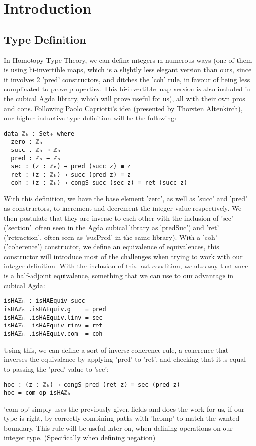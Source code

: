 \chapter{Introduction}
\label{ch:intro}

\section{Type Definition}

In Homotopy Type Theory, we can define integers in numerous ways (one of them is using bi-invertible maps, which is a slightly less elegant version than ours\cite{10.1145/3373718.3394760}, since it involves 2 'pred' constructors, and ditches the 'coh' rule, in favour of being less complicated to prove properties. This bi-invertible map version is also included in the cubical Agda library\cite{biinv-agda}, which will prove useful for us), all with their own pros and cons. Following Paolo Capriotti's idea (presented by Thorsten Altenkirch\cite{bonn_2018}), our higher inductive type definition will be the following:
\begin{verbatim}
data ℤₕ : Set₀ where
  zero : ℤₕ
  succ : ℤₕ → ℤₕ
  pred : ℤₕ → ℤₕ
  sec : (z : ℤₕ) → pred (succ z) ≡ z
  ret : (z : ℤₕ) → succ (pred z) ≡ z
  coh : (z : ℤₕ) → congS succ (sec z) ≡ ret (succ z)
\end{verbatim}
With this definition, we have the base element 'zero', as well as 'succ' and 'pred' as constructors, to increment and decrement the integer value respectively. We then postulate that they are inverse to each other with the inclusion of 'sec' ('section', often seen in the Agda cubical library as 'predSuc') and 'ret' ('retraction', often seen as 'sucPred' in the same library). With a 'coh' ('coherence') constructor, we define an equivalence of equivalences, this constructor will introduce most of the challenges when trying to work with our integer definition. With the inclusion of this last condition, we also say that succ is a half-adjoint equivalence, something that we can use to our advantage in cubical Agda:
\begin{verbatim}
isHAℤₕ : isHAEquiv succ
isHAℤₕ .isHAEquiv.g    = pred
isHAℤₕ .isHAEquiv.linv = sec
isHAℤₕ .isHAEquiv.rinv = ret
isHAℤₕ .isHAEquiv.com  = coh
\end{verbatim}
Using this, we can define a sort of inverse coherence rule, a coherence that inverses the equivalence by applying 'pred' to 'ret', and checking that it is equal to passing the 'pred' value to 'sec':
\begin{verbatim}
hoc : (z : ℤₕ) → congS pred (ret z) ≡ sec (pred z)
hoc = com-op isHAℤₕ
\end{verbatim}
'com-op' simply uses the previously given fields and does the work for us, if our type is right, by correctly combining paths with 'hcomp' to match the wanted boundary.
This rule will be useful later on, when defining operations on our integer type. (Specifically when defining negation)


